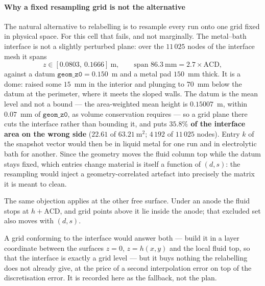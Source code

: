 \documentclass[11pt,a4paper]{article}
\theoremstyle{plain}
\theoremstyle{definition}
\theoremstyle{remark}
\begin{document}
\label{meas:dome}
\paragraph{Why a fixed resampling grid is not the alternative}
The natural alternative to relabelling is to resample every run onto one grid
fixed in physical space. For this cell that fails, and not marginally. The
metal--bath interface is not a slightly perturbed plane: over the
$11\,025$ nodes of the interface mesh it spans
\[
  z \in [0.0803,\ 0.1666]\ \text{m}, \qquad
  \text{span } 86.3\ \text{mm} = 2.7 \times \mathrm{ACD},
\]
against a datum $\texttt{geom\_z0} = 0.150$~m and a metal pad $150$~mm thick.
It is a dome: raised some $15$~mm in the interior and plunging to $70$~mm below
the datum at the perimeter, where it meets the sloped walls. The datum is the
mean level and not a bound --- the area-weighted mean height is $0.15007$~m,
within $0.07$~mm of $\texttt{geom\_z0}$, as volume conservation requires --- so a
grid plane there cuts the interface rather than bounding it, and puts
\textbf{$35.8\%$ of the interface area on the wrong side} ($22.61$ of
$63.21\ \mathrm{m^2}$; $4\,192$ of $11\,025$ nodes). Entry $k$ of the snapshot
vector would then be in liquid metal for one run and in electrolytic bath for
another. Since the
geometry moves the fluid column top while the datum stays fixed, which entries
change material is itself a function of $(d,s)$: the resampling would inject a
geometry-correlated artefact into precisely the matrix it is meant to clean.

The same objection applies at the other free surface. Under an anode the fluid
stops at $h + \mathrm{ACD}$, and grid points above it lie inside the anode; that
excluded set also moves with $(d,s)$.

A grid conforming to the interface would answer both --- build it in a layer
coordinate between the surfaces $z=0$, $z=h(x,y)$ and the local fluid top, so
that the interface is exactly a grid level --- but it buys nothing the
relabelling does not already give, at the price of a second interpolation error
on top of the discretisation error. It is recorded here as the fallback, not the
plan.

\label{rem:box-identity}
\end{document}
